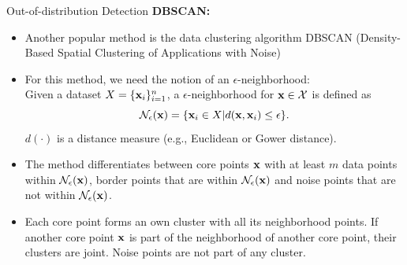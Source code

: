 \documentclass[11pt,compress,t,notes=noshow, xcolor=table]{beamer}
\begin{document}
\begin{frame}{Out-of-distribution Detection}
\textbf{DBSCAN:}
\begin{itemize}
	\item Another popular method is the data clustering algorithm DBSCAN (Density-Based Spatial Clustering of Applications with Noise) 
	\item For this method, we need the notion of an $\epsilon$-neighborhood: \\
	Given a dataset $X = \{\xv_i\}_{i = 1}^n$, a $\epsilon$-neighborhood for $\xv \in \Xspace$ is defined as 
	$$ \mathcal{N}_{\epsilon}(\xv) = \{\xv_i \in X | d(\xv, \xv_i) \le \epsilon\}.$$
	 $d(\cdot)$ is a distance measure (e.g., Euclidean or Gower distance). 
	\item The method differentiates between core points $\xv$ with at least $m$ data points within $\mathcal{N}_{\epsilon}(\xv)$, border points that are within $\mathcal{N}_{\epsilon}(\xv)$ and noise points that are not within $\mathcal{N}_{\epsilon}(\xv)$.
	\item Each core point forms an own cluster with all its neighborhood points. If another core point $\xv$ is part of the neighborhood of another core point, their clusters are joint. Noise points are not part of any cluster. 
\end{itemize}
\vspace{-0.6cm}
\end{frame}
\end{document}
